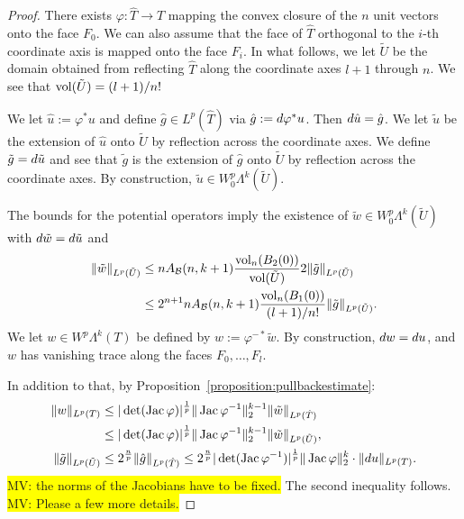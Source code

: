 \documentclass[10pt,letterpaper]{article}
\newcommand{\todo}[1]{{\colorbox{yellow}{#1}}}
\begin{document}
\begin{proof}
    There exists $\varphi : \hat T \rightarrow T$ mapping the convex closure of the $n$ unit vectors onto the face $F_0$.
    We can also assume that the face of $\hat T$
    orthogonal to the $i$-th coordinate axis is mapped 
    onto the face $F_i$. 
    In what follows, we let $\tilde U$ be the domain obtained from reflecting $\hat T$ along the coordinate axes $l+1$ through $n$. 
    We see that $\operatorname{vol}(\tilde U) = (l+1)/n!$
    
    We let $\hat u := \varphi^{\ast} u$ and define $\hat g \in L^{p}(\hat T)$ via $\hat g := d \varphi^{\ast} u$. 
    Then $d \hat u = \hat g$. 
    We let $\tilde u$ be the extension of $\hat u$ onto $\tilde U$ by reflection across the coordinate axes.
    We define $\tilde g = d \tilde u$
    and see that $\tilde g$ is the extension of $\hat g$ onto $\tilde U$ by reflection across the coordinate axes. 
    By construction, $\tilde u \in W^{p}_{0}\Lambda^{k}(\tilde U)$.
    
    The bounds for the potential operators imply 
    the existence of $\tilde w \in W^{p}_{0}\Lambda^{k}(\tilde U)$
    with $d \tilde w = d \tilde u$ and 
    \begin{align*}
        \| \tilde w \|_{L^{p}(\tilde U)}
        &\leq 
        n A_{{\mathcal B}}(n,k+1) \frac{ \operatorname{vol}_{n}(B_2(0)) }{ \operatorname{vol}(\tilde U) } 
        2
        \| \tilde g \|_{L^{p}(\tilde U)}
        \\&\leq 
        2^{n+1} n A_{{\mathcal B}}(n,k+1) \frac{ \operatorname{vol}_{n}(B_1(0)) }{ (l+1)/n! } 
        \| \tilde g \|_{L^{p}(\tilde U)}
        .
    \end{align*}
    We let $w \in W^{p}\Lambda^{k}(T)$ be defined by $w := \varphi^{-\ast} \tilde w$.
    By construction, $d w = d u$,
    and $w$ has vanishing trace along the faces $F_{0},\dots,F_{l}$.
    
    In addition to that, by Proposition~\ref{proposition:pullbackestimate}:
    \begin{align*}
        \| w \|_{L^{p}(T)}
        &\leq 
        |\det(\operatorname{{\rm Jac}} \varphi)|^{\frac 1 p} 
        \|  \operatorname{{\rm Jac}} \varphi^{-1}  \|_{2}^{k-1}
        \| \tilde w \|_{L^{p}(\hat T)}
        \\&
        \leq 
        |\det(\operatorname{{\rm Jac}} \varphi)|^{\frac 1 p} 
        \|  \operatorname{{\rm Jac}} \varphi^{-1}  \|_{2}^{k-1}
        \| \tilde w \|_{L^{p}(\tilde U)}
        ,
        \\
        \| \tilde g \|_{L^{p}(\tilde U)}
        &\leq 
        2^{\frac n p}
        \| \hat g \|_{L^{p}(\hat T)}
        \leq 
        2^{\frac n p}
        |\det( \operatorname{{\rm Jac}} \varphi^{-1} )|^{\frac 1 p} 
        \| \operatorname{{\rm Jac}} \varphi \|_{2}^{k}
        \cdot 
        \| d u \|_{L^{p}(T)}
        .
    \end{align*}
    \todo{MV: the norms of the Jacobians have to be fixed.}
    The second inequality follows.
    \todo{MV: Please a few more details.}
\end{proof}
\end{document}
